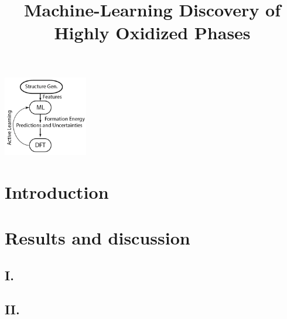 \documentclass[journal=jacsat,manuscript=article]{achemso}
\title[ML discovered IrOx phases]{
  Machine-Learning Discovery of Highly Oxidized \IrOx Phases}
\begin{document}
\begin{tocentry}
\begin{center}
\includegraphics[height=3.5cm]{02_figures/Surrogate_model}
\end{center}
\end{tocentry}


\begin{abstract}

\end{abstract}

\section{Introduction}


\section{Results and discussion}

  \subsection{I. }
  

  \subsection{II. }
  

\end{document}
